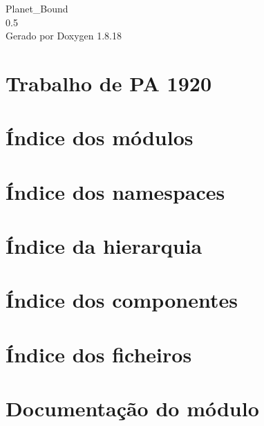\let\mypdfximage\pdfximage\def\pdfximage{\immediate\mypdfximage}\documentclass[twoside]{book}
\newcommand{\+}{\discretionary{\mbox{\scriptsize$\hookleftarrow$}}{}{}}
\newcommand{\clearemptydoublepage}{%
  \newpage{\pagestyle{empty}\cleardoublepage}%
}
\begin{document}
\hypersetup{pageanchor=false,
             bookmarksnumbered=true,
             pdfencoding=unicode
            }
\begin{titlepage}
\vspace*{7cm}
\begin{center}%
{\Large Planet\+\_\+\+Bound \\[1ex]\large 0.\+5 }\\
\vspace*{1cm}
{\large Gerado por Doxygen 1.8.18}\\
\end{center}
\end{titlepage}
\clearemptydoublepage
{}
\tableofcontents
\clearemptydoublepage
{}
\hypersetup{pageanchor=true}

\chapter{Trabalho de PA 1920}
\label{index}\hypertarget{index}{}
\chapter{Índice dos módulos}

\chapter{Índice dos namespaces}

\chapter{Índice da hierarquia}

\chapter{Índice dos componentes}

\chapter{Índice dos ficheiros}

\chapter{Documentação do módulo}




\end{document}
